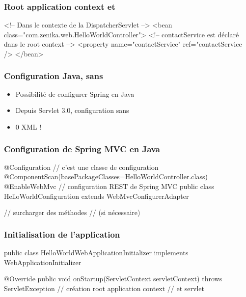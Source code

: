 \begin{frame}[fragile]
 \frametitle{Root application context et }
 
 \begin{xmlcode}
<!-- Dans le contexte de la DispatcherServlet -->
<bean class="com.zenika.web.HelloWorldController">
  <!-- contactService est d\'eclar\'e dans le root context -->
  <property name="contactService" 
            ref="contactService />
</bean>
 \end{xmlcode}

\end{frame}
 
 \begin{frame}
 \frametitle{Configuration Java, sans }
 
 \begin{itemize}
  \item Possibilité de configurer Spring en Java
  \item Depuis Servlet 3.0, configuration sans 
  \item 0 XML !
 \end{itemize}
 
\end{frame}

\begin{frame}[fragile]
 \frametitle{Configuration de Spring MVC en Java}
 
 \begin{javacode}
@Configuration // c'est une classe de configuration
@ComponentScan(basePackageClasses=HelloWorldController.class)
@EnableWebMvc  // configuration REST de Spring MVC
public class HelloWorldConfiguration 
       extends WebMvcConfigurerAdapter { // surcharger des m\'ethodes 
                                         // (si n\'ecessaire)
	
}
 \end{javacode}

\end{frame}

\begin{frame}[fragile]
 \frametitle{Initialisation de l'application}
 
 \begin{javacode}
public class HelloWorldWebApplicationInitializer
       implements WebApplicationInitializer {

  @Override
  public void onStartup(ServletContext servletContext)
              throws ServletException {
    // cr\'eation root application context
    // et servlet
  }

}
 \end{javacode}
 
\end{frame}

